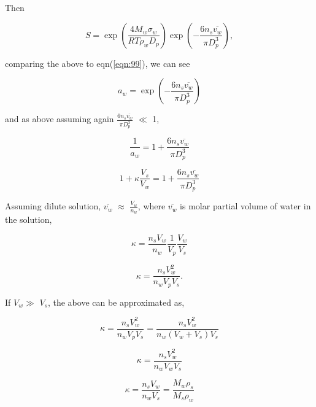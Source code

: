 \documentclass[12pt]{article}
\begin{document}
\begin{itemize}
Then 

\begin{equation}
S=\exp{(\frac{4M_{w}\sigma_{w}}{RT\rho_{w}D_{p}})} \exp{( - \frac{6 n_{s} {\overline{v_{w} } } } {\pi D_{p}^{3}})},  
\end{equation}

comparing the above to eqn(\ref{eqn:99}), we can see

\begin{equation}
a_{w}=\exp{(- \frac {6 n_{s} {\overline{v_{w} } } } {\pi D_{p}^{3}}) }
\end{equation}

and as above assuming again $\frac{6 n_{s} \overline{v_{w}} } {\pi D_{p}^{3}}$ $\ll$ 1,

\begin{equation}
\frac{1}{a_{w}}=1+\frac{6 n_{s} \overline{v_{w}} } {\pi D_{p}^{3}} 
\end{equation}

\begin{equation}
1+\kappa \frac{V_{s}}{V_{w}}=1+\frac{6 n_{s} \overline{v_{w}} } {\pi D_{p}^{3}} 
\end{equation}

Assuming dilute solution, $\overline{v_{w}}$ $\approx$ $\frac{V_{w}}{n_{w}}$, where $\overline{v_{w}}$ is molar partial volume of water in the solution, 

\begin{equation}\label{eqn:106}
\kappa=\frac{n_{s} V_{w}}{ n_{w}} \frac{1} {V_{p}} \frac{V_{w}}{V_{s}}
\end{equation}

\begin{equation}\label{eqn:107}
\kappa=\frac{n_{s}V_{w}^{2}}{n_{w}V_{p} V_{s}}.
\end{equation}

If $V_{w}$$\gg$ $V_{s}$, the above can be approximated as,

\begin{equation}\label{eqn:108}
\kappa=\frac{n_{s}V_{w}^{2}}{n_{w}V_{p} V_{s}}= \frac{n_{s}V_{w}^{2}}{n_{w} (V_{w}+V_{s}) V_{s}}
\end{equation}

\begin{equation}\label{eqn:109}
\kappa=\frac{n_{s}V_{w}^{2}}{n_{w} V_{w}V_{s}}
\end{equation}

\begin{equation}\label{eqn:110}
\kappa=\frac{n_{s}V_{w}}{n_{w} V_{s}}=\frac{M_{w} \rho_{s}}{ M_{s} \rho_{w} }
\end{equation}



\end{itemize}
\end{document}
